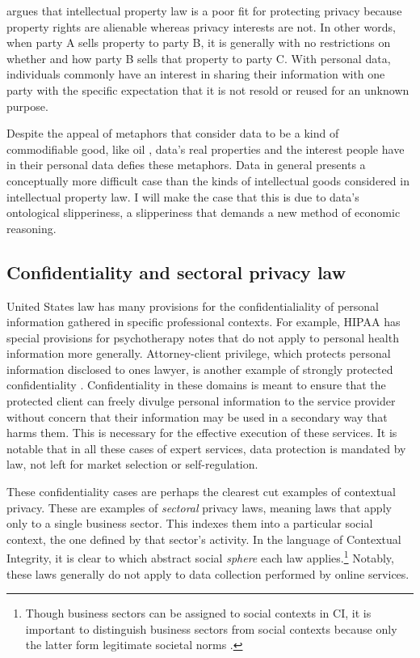 \documentclass[../thesis.tex]{subfiles}
\begin{document}
\citet{samuelson2000privacy} argues that intellectual
property law is a poor fit for protecting privacy because
property rights are alienable whereas privacy interests
are not.
In other words, when party A sells property to party B,
it is generally with no restrictions on whether and how
party B sells that property to party C.
With personal data, individuals commonly have an interest
in sharing their information with one party with the
specific expectation that it is not resold or reused
for an unknown purpose.

Despite the appeal of metaphors that consider data
to be a kind of commodifiable good, like oil 
\citep{hirsch2013glass},
data's real properties and the interest people
have in their personal data defies these metaphors.
Data in general presents a conceptually more
difficult case than the kinds of intellectual
goods considered in intellectual property law.
I will make the case that this is due to data's
ontological slipperiness, a slipperiness that
demands a new method of economic reasoning.

\subsection{Confidentiality and sectoral privacy law}
\label{sec:confidentiality}

United States law has many provisions for the
confidentialiality of personal information gathered
in specific professional contexts.
For example, HIPAA has special provisions for
psychotherapy notes that do not apply to personal health
information more generally.
Attorney-client privilege, which protects personal information
disclosed to ones lawyer, is another example of strongly
protected confidentiality \cite{hazard1978historical} 
\cite{allen1990positive} \cite{richards2007privacy}.
Confidentiality in these domains is meant to ensure
that the protected client can freely divulge personal
information to the service provider without concern
that their information may be used in a secondary way
that harms them.
This is necessary for the effective execution of
these services.
It is notable that in all these cases of expert services,
data protection is mandated by law, not left for market
selection or self-regulation.

These confidentiality cases are perhaps the clearest
cut examples of contextual privacy.
These are examples of \emph{sectoral} privacy laws,
meaning laws that apply only to a single business sector.
This indexes them into a particular social context, the
one defined by that sector's activity.
In the language of Contextual Integrity,
it is clear to which abstract social \emph{sphere}
each law applies.\footnote{Though business sectors can
  be assigned to social contexts in CI, it is important
  to distinguish business sectors from social contexts
  because only the latter form legitimate societal norms
\cite{nissenbaum2015respecting}.}
Notably, these laws generally do not apply to
data collection performed by online services.
\end{document}
